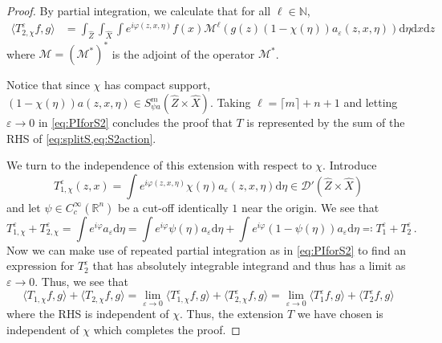 \documentclass[
	fontsize=11pt, 
	twoside=false, 
	abstract=true, 
	a4paper,
]{scrartcl}
\newcommand{\eps}{\varepsilon}
\newcommand{\RR}{\mathbb{R}}
\newcommand{\dd}{\mathrm{d}}
\begin{document}
\begin{proof}
	By partial integration, we calculate that for all $\ell\in\mathbb{N}$,
	\begin{equation}\label{eq:PIforS2}
	\begin{aligned}
		\langle T_{2,\chi}^{\eps}f,g\rangle &= \int_{\hat Z}\int_{\hat X}\int e^{i\varphi(z,x,\eta)}f(x)\mathcal{M}^\ell \left(g(z) (1-\chi(\eta))a_{\eps}(z,x,\eta)\right) \dd \eta \dd x \dd z 
	\end{aligned}
\end{equation}
	where $\mathcal{M}=(\mathcal{M}^\ast)^\ast$ is the adjoint of the operator $\mathcal{M}^\ast$.

	Notice that since $\chi$ has compact support, $(1-\chi(\eta))a(z,x,\eta)\in S^{m}_{\psi a}(\hat Z\times\hat X)$. %
	Taking $\ell = \lceil m \rceil + n + 1$ and letting $\eps \to 0$ in \cref{eq:PIforS2} concludes the proof that $T$ is represented by the sum of the RHS of \cref{eq:splitS,eq:S2action}.

	We turn to the independence of this extension with respect to $\chi$. Introduce
	\[
		T_{1,\chi}^{\eps}(z,x) = \int e^{i\varphi(z,x,\eta)}\chi(\eta)a_\eps(z,x,\eta)\dd\eta \in \mathcal{D}'(\hat Z\times\hat X)
	\]
	and let $\psi \in C_c^\infty(\RR^n)$ be a cut-off identically $1$ near the origin. We see that
	\[
		T^\eps_{1,\chi} +T^\eps_{2,\chi} = \int e^{i\varphi}a_\eps\dd\eta = \int e^{i\varphi}\psi(\eta)a_\eps\dd\eta+ \int e^{i\varphi}(1-\psi(\eta))a_\eps\dd\eta \eqqcolon T_1^\eps + T^\eps_2\,.
	\]
	Now we can make use of %
	repeated partial integration as in \cref{eq:PIforS2} to find an expression for $T^\eps_2$ that has absolutely integrable integrand and thus has a limit as $\eps \to 0$. Thus, we see that
	\[
		\langle T_{1,\chi}f,g\rangle + \langle T_{2,\chi} f,g\rangle = \lim_{\eps \to 0} \langle T_{1,\chi}^\eps f,g\rangle + \langle T_{2,\chi}^\eps f,g\rangle =  \lim_{\eps\to 0} \langle T_{1}^\eps f,g\rangle + \langle T_{2}^\eps f,g\rangle
	\]
	where the RHS is independent of $\chi$. Thus, the extension $T$ we have chosen is independent of $\chi$ which completes the proof.
\end{proof}

\end{document}
